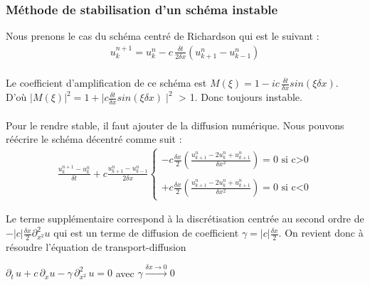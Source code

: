 \documentclass[12pt]{article}
\begin{document}
\subsubsection{Méthode de stabilisation d'un schéma instable}
\noindent Nous prenons le cas du schéma centré de Richardson qui est le suivant :
\begin{eqnarray*}
         u_k^{n+1} = u_k^n - c \, \frac{\delta t}{2\delta x}(u_{k+1}^n - u_{k-1}^n)
\end{eqnarray*}
\\
Le coefficient d’amplification de ce schéma est $M(\xi) = 1 - ic\,\displaystyle \frac{\delta t}{\delta x} sin(\xi \delta x)$.
\\D'où $|M(\xi)|^2 = 1 + \mid c\displaystyle\frac{\delta t}{\delta x} sin(\xi \delta x)\mid^2$ > 1. Donc toujours instable.\\\\
Pour le rendre stable, il faut ajouter de la diffusion numérique. Nous pouvons réécrire le schéma décentré comme suit :
\begin{eqnarray*}
	\frac{u_k^{n+1} - u_k^n}{\delta t} + c\frac{u_{k+1}^n - u_{k-1}^n}{2\delta x}
	\left\{ 
		\begin{array}{llll}
			-c \displaystyle \frac{\delta x }{2}(\frac{u_{k+1}^n - 2u_{k}^n + u_{k+1}^n}{\delta x^2}) = 0 \mbox{ si c>0}
			\\
			\\
			+c \displaystyle \frac{\delta x }{2}(\frac{u_{k+1}^n - 2u_k^n + u_{k+1}^n}{\delta x^2}) = 0 \mbox{ si c<0}
		\end{array} 
	\right.
\end{eqnarray*}


\noindent Le terme supplémentaire correspond à la discrétisation centrée au second ordre de $\displaystyle -|c|\frac{\delta x}{2}\partial_{x^2}^2 u$ qui est un terme de diffusion de coefficient $\displaystyle \gamma =  |c|\frac{\delta x}{2}.$ On revient donc à résoudre l'équation de transport-diffusion \cite{ref8}
\begin{center}
   $\displaystyle \partial_t \,u + c\, \partial_x u - \gamma \, \partial_{x^2}^2 \, u = 0$ avec $\displaystyle \gamma \xrightarrow{\delta x \rightarrow 0} 0$ 
\end{center}

\newpage
\end{document}
